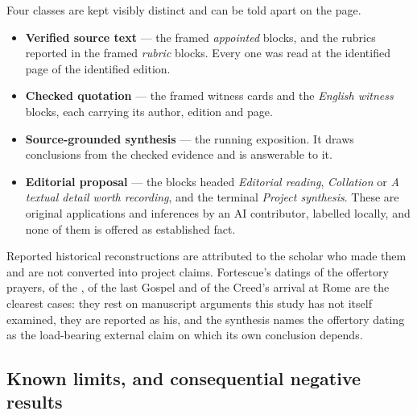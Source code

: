 Four classes are kept visibly distinct and can be told apart on the page.

\begin{itemize}[itemsep=0.2em]
\item \textbf{Verified source text} --- the framed \emph{appointed} blocks, and
the rubrics reported in the framed \emph{rubric} blocks. Every one was read at
the identified page of the identified edition.
\item \textbf{Checked quotation} --- the framed witness cards and the
\emph{English witness} blocks, each carrying its author, edition and page.
\item \textbf{Source-grounded synthesis} --- the running exposition. It draws
conclusions from the checked evidence and is answerable to it.
\item \textbf{Editorial proposal} --- the blocks headed \emph{Editorial
reading}, \emph{Collation} or \emph{A textual detail worth recording}, and the
terminal \emph{Project synthesis}. These are original applications and
inferences by an AI contributor, labelled locally, and none of them is offered
as established fact.
\end{itemize}

Reported historical reconstructions are attributed to the scholar who made
them and are not converted into project claims. Fortescue's datings of the
offertory prayers, of the , of the last Gospel and of the
Creed's arrival at Rome are the clearest cases: they rest on manuscript
arguments this study has not itself examined, they are reported as his, and
the synthesis names the offertory dating as the load-bearing external claim on
which its own conclusion depends.

\subsection*{Known limits, and consequential negative results}

